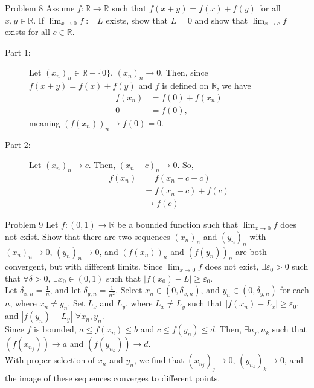 \documentclass[10pt]{extarticle}
\newcommand{\R}{\mathbb{R}}
\begin{document}
  \begin{problem}{Problem 8}
    Assume $f:\R\rightarrow \R$ such that $f(x+y) = f(x) + f(y)$ for all $x,y\in\R$. If $\lim_{x\rightarrow 0}f := L$ exists, show that $L = 0$ and show that $\lim_{x\rightarrow c}f$ exists for all $c\in\R$.
    \tcblower
    \begin{description}
      \item[Part 1:] Let $(x_n)_n \in \R-\{0\}$, $(x_n)_n \rightarrow 0$. Then, since $f(x+y) = f(x) + f(y)$ and $f$ is defined on $\R$, we have
        \begin{align*}
          f(x_n) &= f(0) + f(x_n)\\
          0 &= f(0),
        \end{align*}
        meaning $(f(x_n))_n \rightarrow f(0) = 0$.
      \item[Part 2:] Let $(x_n)_n \rightarrow c$. Then, $(x_n-c)_n \rightarrow 0$. So,
        \begin{align*}
          f(x_n) &= f(x_n - c + c)\\
                 &= f(x_n - c) + f(c)\\
                 &\rightarrow f(c)
        \end{align*}
    \end{description}
  \end{problem}
  \begin{problem}{Problem 9}
    Let $f:(0,1) \rightarrow \R$ be a bounded function such that $\lim_{x\rightarrow 0} f$ does not exist. Show that there are two sequences $(x_n)_n$ and $(y_n)_n$ with $(x_n)_n \rightarrow 0$, $(y_n)_n \rightarrow 0$, and $(f(x_n))_n$ and $(f(y_n))_n$ are both convergent, but with different limits.
    \tcblower
    Since $\lim_{x\rightarrow 0}f$ does not exist, $\exists \varepsilon_0 > 0$ such that $\forall \delta > 0$, $\exists x_0 \in (0,1)$ such that $|f(x_0) - L| \geq \varepsilon_0$.\\

    Let $\delta_{x,n} = \frac{1}{n}$, and let $\delta_{y,n} = \frac{1}{n^2}$. Select $x_n \in (0,\delta_{x,n})$, and $y_n \in (0,\delta_{y,n})$ for each $n$, where $x_n \neq y_n$. Set $L_x$ and $L_y$, where $L_x \neq L_y$ such that $|f(x_n) - L_x| \geq \varepsilon_0$, and $|f(y_n)-L_y|$ $\forall x_n,y_n$.\\

    Since $f$ is bounded, $a\leq f(x_n) \leq b$ and $c\leq f(y_n) \leq d$. Then, $\exists n_j,n_k$ such that $\left(f(x_{n_j})\right)\rightarrow a$ and $\left(f(y_{n_k})\right) \rightarrow d$. \\

    With proper selection of $x_n$ and $y_n$, we find that $(x_{n_j})_j \rightarrow 0$, $(y_{n_k})_k\rightarrow 0$, and the image of these sequences converges to different points.
  \end{problem}
\end{document}
